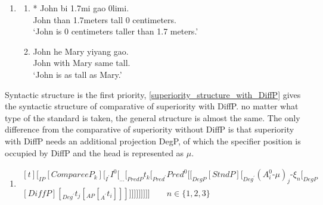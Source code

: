 \documentclass{ctexart}
\begin{document}
\begin{enumerate}
    \item \label{superiority_example_9}
    \begin{enumerate}
        \item \label{superiority_example_9_a}
        * John bi \enspace \enspace 1.7mi \enspace \enspace \enspace \enspace gao \enspace \enspace 0limi. \\
        \hspace*{0.5em} John than 1.7meters tall 0 centimeters. \\
        \hspace*{0.5em} `John is 0 centimeters taller than 1.7 meters.'

        \item \label{superiority_example_9_b}
        John he Mary yiyang gao. \\
        John with Mary same tall.  \\
        `John is as tall as Mary.'

    \end{enumerate}
\end{enumerate}

Syntactic structure is the first priority, \ref{superiority_structure_with_DiffP} gives the syntactic structure of comparative of superiority with DiffP. no matter what type of the standard is taken, the general structure is almost the same. The only difference from the comparative of superiority without DiffP is that superiority with DiffP needs an additional projection DegP, of which the specifier position is occupied by DiffP and the head is represented as $\mu$.

\begin{enumerate}
    \item \label{superiority_structure_with_DiffP}
    $\begin{aligned}[t]
        [_{IP} [CompareeP_k] [_{I^{\prime}} I^{0} [_{...} [_{PredP} t_k [_{Pred^{\prime}} Pred^0 [[_{DegP} [StndP] [_{Deg^{\prime}} (A_i^0 \mbox{-} \mu)_j \mbox{-} \xi_{n} [_{DegP} \\ [DiffP] [_{Deg^{\prime}} t_j [_{AP} [_{A^{\prime}} t_i]]]]]]]]]]]] 
        \qquad n \in \{1, 2, 3\}
    \end{aligned}$
\end{enumerate}
\end{document}
